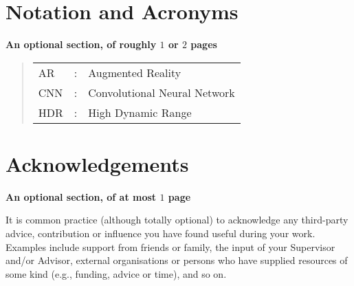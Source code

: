 \documentclass[ %
                    author={Gavin Parker},
                supervisor={Dr. Neill Campbell},
                    degree={MEng},
                     title={Deep Siamese Networks for Illumination Estimation from Stereo Images},
                  subtitle={},
                      type={research},
                      year={2018} ]{dissertation}
\begin{document}

\chapter*{Notation and Acronyms}

{\bf An optional section, of roughly $1$ or $2$ pages}
\vspace{1cm} 


\begin{quote}
\noindent
\begin{tabular}{lcl}
AR                 &:     & Augmented Reality                                         \\
CNN                 &:     & Convolutional Neural Network                             \\
HDR					&:		& High Dynamic Range
\end{tabular}
\end{quote}


\chapter*{Acknowledgements}

{\bf An optional section, of at most $1$ page}
\vspace{1cm} 

\noindent
It is common practice (although totally optional) to acknowledge any
third-party advice, contribution or influence you have found useful
during your work.  Examples include support from friends or family, 
the input of your Supervisor and/or Advisor, external organisations 
or persons who  have supplied resources of some kind (e.g., funding, 
advice or time), and so on.


%
\end{document}
